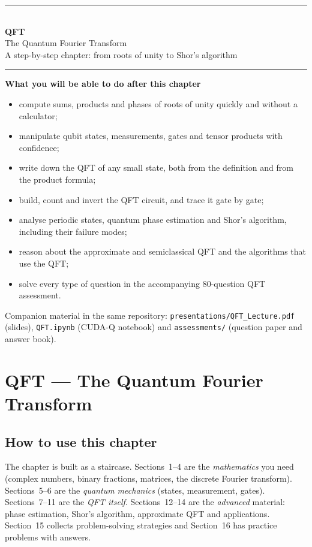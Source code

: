 \documentclass[11pt,a4paper,openany]{book}
\begin{document}
\begin{titlepage}
\centering
{\color{brand}\rule{\linewidth}{1.5pt}}\\[10pt]
{\Huge\bfseries\color{brand} QFT}\\[8pt]
{\LARGE The Quantum Fourier Transform}\\[6pt]
{\large A step-by-step chapter: from roots of unity to Shor's algorithm}\\[6pt]
{\color{brand}\rule{\linewidth}{1.5pt}}
\vspace{18mm}

\begin{minipage}{0.86\linewidth}
\large
\textbf{What you will be able to do after this chapter}
\begin{itemize}[itemsep=3pt]
\item compute sums, products and phases of roots of unity quickly and without a calculator;
\item manipulate qubit states, measurements, gates and tensor products with confidence;
\item write down the QFT of any small state, both from the definition and from the product formula;
\item build, count and invert the QFT circuit, and trace it gate by gate;
\item analyse periodic states, quantum phase estimation and Shor's algorithm, including their failure modes;
\item reason about the approximate and semiclassical QFT and the algorithms that use the QFT;
\item solve every type of question in the accompanying 80-question QFT assessment.
\end{itemize}
\end{minipage}
\vfill
{\small Companion material in the same repository: \texttt{presentations/QFT\_Lecture.pdf} (slides),
\texttt{QFT.ipynb} (CUDA-Q notebook) and \texttt{assessments/} (question paper and answer book).}
\end{titlepage}

\tableofcontents
\setcounter{chapter}{0}
\chapter*{QFT --- The Quantum Fourier Transform}

\section*{How to use this chapter}
The chapter is built as a staircase. Sections~1--4 are the \emph{mathematics} you need (complex numbers, binary
fractions, matrices, the discrete Fourier transform). Sections~5--6 are the \emph{quantum mechanics} (states,
measurement, gates). Sections~7--11 are the \emph{QFT itself}. Sections~12--14 are the \emph{advanced} material:
phase estimation, Shor's algorithm, approximate QFT and applications. Section~15 collects problem-solving strategies
and Section~16 has practice problems with answers.
\end{document}
